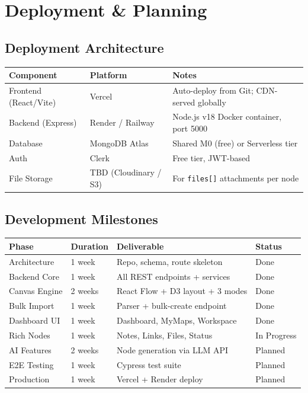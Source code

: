 \documentclass[12pt, a4paper]{article}
\begin{document}
\section{Deployment \& Planning}

\subsection{Deployment Architecture}
\begin{center}
\begin{tabular}{lll}
\toprule
\textbf{Component} & \textbf{Platform} & \textbf{Notes} \\
\midrule
Frontend (React/Vite) & Vercel & Auto-deploy from Git; CDN-served globally \\
Backend (Express) & Render / Railway & Node.js v18 Docker container, port 5000 \\
Database & MongoDB Atlas & Shared M0 (free) or Serverless tier \\
Auth & Clerk & Free tier, JWT-based \\
File Storage & TBD (Cloudinary / S3) & For \texttt{files[]} attachments per node \\
\bottomrule
\end{tabular}
\end{center}

\subsection{Development Milestones}
\begin{center}
\begin{tabular}{llll}
\toprule
\textbf{Phase} & \textbf{Duration} & \textbf{Deliverable} & \textbf{Status} \\
\midrule
Architecture & 1 week & Repo, schema, route skeleton & \textcolor{codegreen}{Done} \\
Backend Core & 1 week & All REST endpoints + services & \textcolor{codegreen}{Done} \\
Canvas Engine & 2 weeks & React Flow + D3 layout + 3 modes & \textcolor{codegreen}{Done} \\
Bulk Import & 1 week & Parser + bulk-create endpoint & \textcolor{codegreen}{Done} \\
Dashboard UI & 1 week & Dashboard, MyMaps, Workspace & \textcolor{codegreen}{Done} \\
Rich Nodes & 1 week & Notes, Links, Files, Status & In Progress \\
AI Features & 2 weeks & Node generation via LLM API & Planned \\
E2E Testing & 1 week & Cypress test suite & Planned \\
Production & 1 week & Vercel + Render deploy & Planned \\
\bottomrule
\end{tabular}
\end{center}
\end{document}
